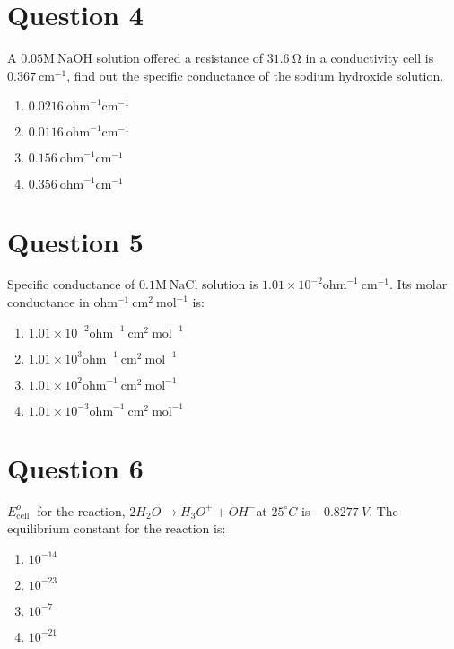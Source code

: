 \documentclass{article}
\begin{document}
\section*{Question 4}
A \(0.05 \mathrm{M} ~\mathrm{NaOH}\) solution offered a resistance of \(31.6~ \mathrm{\Omega}\) in a conductivity cell is \(0.367 \mathrm{~cm}^{-1}\), find out the specific conductance of the sodium hydroxide solution.
\begin{enumerate}[label=(\alph*)]
\item \(0.0216 \mathrm{~ohm}^{-1} \mathrm{cm}^{-1}\)
\item \(0.0116 \mathrm{~ohm}^{-1} \mathrm{cm}^{-1}\)
\item \(0.156 \mathrm{~ohm}^{-1} \mathrm{cm}^{-1}\)
\item \( 0.356 \mathrm{~ohm}^{-1} \mathrm{cm}^{-1}\)
\end{enumerate}
\newpage
\section*{Question 5}
Specific conductance of \(0.1 \mathrm{ {M} {~NaCl}}\) solution is \(1.01 \times 10^{-2} \mathrm{{ohm}^{-1} {~cm}^{-1}}\). Its molar conductance in \(\mathrm{ohm ^{-1} {~cm}^{2} {~mol}^{-1}}\) is:
\begin{enumerate}[label=(\alph*)]
\item \(1.01 \times 10^{-2} \mathrm{{ohm}^{-1} {~cm}^{2} {~mol}^{-1}}\)\newline
\item \(1.01 \times 10^{3} \mathrm{{ohm}^{-1} {~cm}^{2} {~mol}^{-1}}\)
\item \(1.01 \times 10^{2} \mathrm{{ohm}^{-1} {~cm}^{2} {~mol}^{-1}}\)
\item \(1.01 \times 10^{-3} \mathrm{{ohm}^{-1} {~cm}^{2} {~mol}^{-1}}\)
\end{enumerate}
\newpage
\section*{Question 6}
\(E_{\text {cell }}^{o}\) for the reaction, \(2 {H}_{2} {O} \rightarrow {H}_{3} {O}^{+}+{OH}^{-}\)at \(25^{\circ} {C}\) is \(-0.8277 {~V}\). The equilibrium constant for the reaction is:
\begin{enumerate}[label=(\alph*)]
\item \(10^{-14}\)
\item \(10^{-23}\)
\item \(10^{-7}\)
\item \(10^{-21}\)
\end{enumerate}
\newpage
\end{document}
